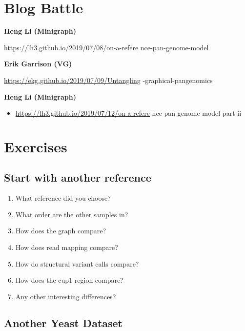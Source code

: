 \documentclass[
]{book}
\providecommand{\tightlist}{%
  \setlength{\itemsep}{0pt}\setlength{\parskip}{0pt}}
\begin{document}
\hypertarget{blog-battle}{%
\section{Blog Battle}\label{blog-battle}}

\textbf{Heng Li (Minigraph)}

\url{https://lh3.github.io/2019/07/08/on-a-refere} nce-pan-genome-model

\textbf{Erik Garrison (VG)}

\url{https://ekg.github.io/2019/07/09/Untangling} -graphical-pangenomics

\textbf{Heng Li (Minigraph)}

\begin{itemize}
\tightlist
\item
  \url{https://lh3.github.io/2019/07/12/on-a-refere} nce-pan-genome-model-part-ii
\end{itemize}

\hypertarget{exercises}{%
\section{Exercises}\label{exercises}}

\hypertarget{start-with-another-reference}{%
\subsection*{Start with another reference}\label{start-with-another-reference}}

\begin{enumerate}
\def\labelenumi{\arabic{enumi}.}
\tightlist
\item
  What reference did you choose?
\item
  What order are the other samples in?
\item
  How does the graph compare?
\item
  How does read mapping compare?
\item
  How do structural variant calls compare?
\item
  How does the cup1 region compare?
\item
  Any other interesting differences?
\end{enumerate}

\hypertarget{another-yeast-dataset}{%
\subsection*{Another Yeast Dataset}\label{another-yeast-dataset}}
\end{document}
